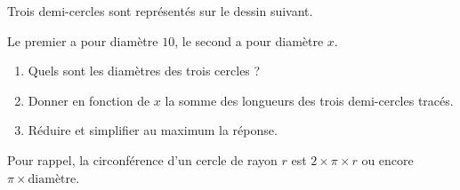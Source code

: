 
\begin{exercice}\label{exo2smath-0156}

    Trois demi-cercles sont représentés sur le dessin suivant.
\begin{center}
   
\end{center}
    Le premier a pour diamètre \( 10\), le second a pour diamètre \( x\).
    \begin{enumerate}
        \item
            Quels sont les diamètres des trois cercles ?
        \item
            Donner en fonction de \( x\) la somme des longueurs des trois demi-cercles tracés.
        \item
            Réduire et simplifier au maximum la réponse.
    \end{enumerate}
    Pour rappel, la circonférence d'un cercle de rayon \( r\) est \( 2\times \pi\times r\) ou encore \( \pi\times \text{diamètre}\).

\end{exercice}
